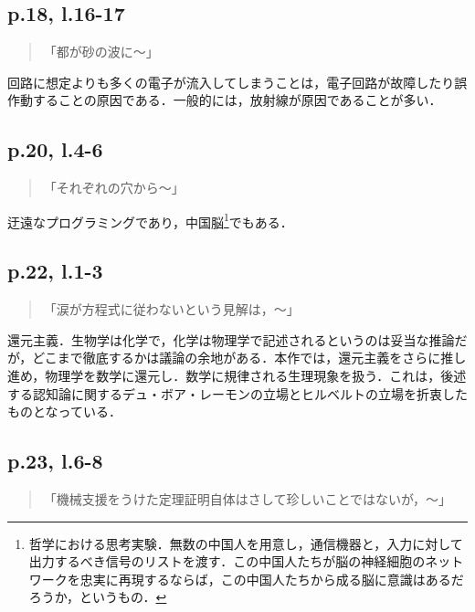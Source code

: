 \documentclass[10pt, a5paper, twoside]{jsarticle}
\theoremstyle{definition}
\begin{document}
		\subsection{p.18, l.16-17}

			\begin{quote}

				「都が砂の波に〜」
				
			\end{quote}

			回路に想定よりも多くの電子が流入してしまうことは，電子回路が故障したり誤作動することの原因である．一般的には，放射線が原因であることが多い．

		\subsection{p.20, l.4-6}

			\begin{quote}

				「それぞれの穴から〜」
				
			\end{quote}

			迂遠なプログラミングであり，中国脳\footnote{哲学における思考実験．無数の中国人を用意し，通信機器と，入力に対して出力するべき信号のリストを渡す．この中国人たちが脳の神経細胞のネットワークを忠実に再現するならば，この中国人たちから成る脳に意識はあるだろうか，というもの．}でもある．

		\subsection{p.22, l.1-3}

			\begin{quote}

				「涙が方程式に従わないという見解は，〜」

			\end{quote}

			還元主義．生物学は化学で，化学は物理学で記述されるというのは妥当な推論だが，どこまで徹底するかは議論の余地がある．本作では，還元主義をさらに推し進め，物理学を数学に還元し．数学に規律される生理現象を扱う．これは，後述する認知論に関するデュ・ボア・レーモンの立場とヒルベルトの立場を折衷したものとなっている．

		\subsection{p.23, l.6-8}

			\begin{quote}
				
				「機械支援をうけた定理証明自体はさして珍しいことではないが，〜」
				
			\end{quote}
\end{document}
